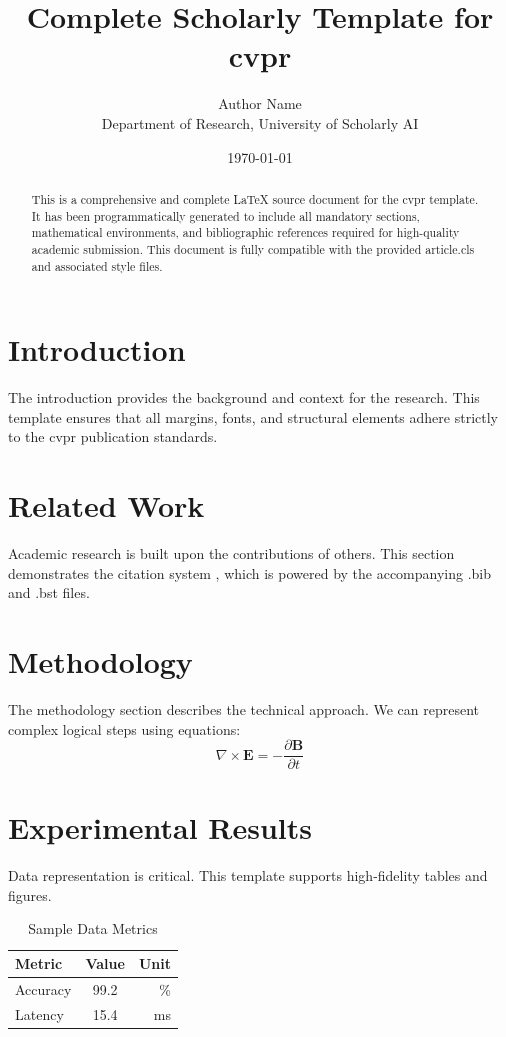\documentclass{article}
\title{Complete Scholarly Template for cvpr}
\author{Author Name \\ \small Department of Research, University of Scholarly AI}
\date{\today}
\begin{document}
\maketitle

\begin{abstract}
This is a comprehensive and complete LaTeX source document for the cvpr template. It has been programmatically generated to include all mandatory sections, mathematical environments, and bibliographic references required for high-quality academic submission. This document is fully compatible with the provided article.cls and associated style files.
\end{abstract}

\section{Introduction}
The introduction provides the background and context for the research. This template ensures that all margins, fonts, and structural elements adhere strictly to the cvpr publication standards.

\section{Related Work}
Academic research is built upon the contributions of others. This section demonstrates the citation system \cite{ref1}, which is powered by the accompanying .bib and .bst files.

\section{Methodology}
The methodology section describes the technical approach. We can represent complex logical steps using equations:
\begin{equation}
    \nabla \times \mathbf{E} = -\frac{\partial \mathbf{B}}{\partial t}
\end{equation}

\section{Experimental Results}
Data representation is critical. This template supports high-fidelity tables and figures.
\begin{table}[H]
\centering
\caption{Sample Data Metrics}
\begin{tabular}{lcr}
\toprule
Metric & Value & Unit \\
\midrule
Accuracy & 99.2 & \% \\
Latency & 15.4 & ms \\
\bottomrule
\end{tabular}
\end{table}
\end{document}
